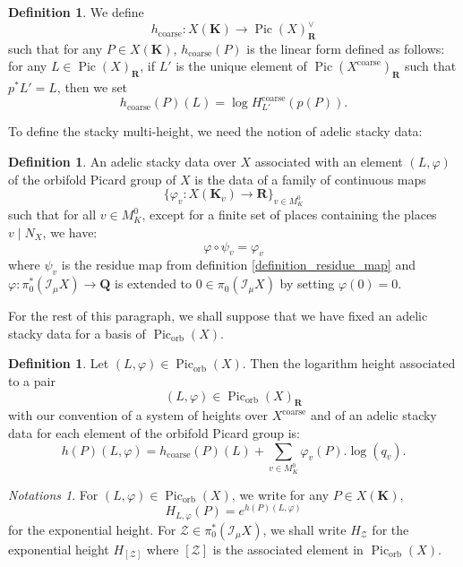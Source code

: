 \documentclass{proc-l}
\newcommand{\R}{\mathbf{R}}
\newcommand{\K}{\mathbf{K}}
\newcommand{\Q}{\mathbf{Q}}
\DeclareMathOperator{\Pic}{Pic}
\DeclareMathOperator{\coarse}{coarse}
\DeclareMathOperator{\orb}{orb}
\newcommand{\stackZ}{\mathcal{Z}}
\newcommand{\sheafI}{\mathcal{I}}
\newcommand{\sector}{\pi_0(\sheafI_{\mu} X)}
\newcommand{\twistsector}{\pi_0^*(\sheafI_{\mu} X)}
\theoremstyle{definition}
\newtheorem{definition}[theorem]{Definition}
\theoremstyle{remark}
\newtheorem{Notations}[theorem]{Notations}
\numberwithin{equation}{section}
\begin{document}
\begin{definition}\label{definition_coarse_multi_height_map}
    We define
    \[
        h_{\coarse} : X(\K) \to \Pic(X)^{\vee}_{\R}
    \]
    such that for any $P \in X(\K)$, $h_{\coarse}(P)$ is the linear form defined as follows: for any $L \in \Pic(X)_{\R}$, if $L'$ is the unique element of $\Pic(X^{\coarse})_{\R}$ such that $p^* L' = L$, then we set
    \[
        h_{\coarse}(P)(L) = \log H^{\coarse}_{L'}(p(P)).
    \]
\end{definition}

To define the stacky multi-height, we need the notion of adelic stacky data:

\begin{definition}\label{definition_adelic_stacky_data}
    An adelic stacky data over $X$ associated with an element $(L,\varphi)$ of the orbifold Picard group of $X$ is the data of a family of continuous maps $$\{\varphi_v : X(\K_v) \rightarrow \R \}_{v \in M_K^0}$$ such that for all $v \in M_K^0$, except for a finite set of places containing the places $v \mid N_X$, we have:
    $$ \varphi \circ \psi_v = \varphi_v $$where $\psi_v$ is the residue map from definition \ref{definition_residue_map} and $\varphi : \twistsector \rightarrow \Q$ is extended to $0 \in \sector$ by setting $\varphi(0) = 0$.
\end{definition}

For the rest of this paragraph, we shall suppose that we have fixed an adelic stacky data for a basis of $\Pic_{\orb}(X)$.

\begin{definition}\label{definition_stacky_height}
    Let $(L,\varphi) \in \Pic_{\orb}(X)$. Then the logarithm height associated to a pair $$(L,\varphi) \in \Pic_{\orb}(X)_{\R}$$ with our convention of a system of heights over $X^{\coarse}$ and of an adelic stacky data for each element of the orbifold Picard group is:
    $$ h(P)(L,\varphi) = h_{\coarse}(P)(L) + \sum\limits_{v \in M_K^0} \varphi_v(P) . \log(q_v) .$$
\end{definition}

\begin{Notations}
    For $(L,\varphi) \in \Pic_{\orb}(X)$, we write for any $P \in X(\K)$, $$H_{L,\varphi}(P) = e^{ h(P)(L,\varphi) }$$for the exponential height. For $\stackZ \in \twistsector$, we shall write $H_{\stackZ}$ for the exponential height $H_{[\stackZ]}$ where $[\stackZ]$ is the associated element in $\Pic_{\orb}(X)$.
\end{Notations}
\end{document}
